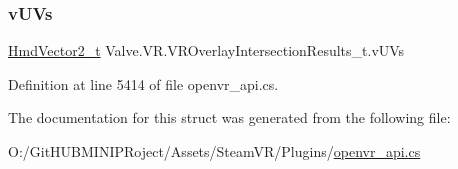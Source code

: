 \subsubsection{\texorpdfstring{vUVs}{vUVs}}
{\footnotesize\ttfamily \mbox{\hyperlink{struct_valve_1_1_v_r_1_1_hmd_vector2__t}{Hmd\+Vector2\+\_\+t}} Valve.\+V\+R.\+V\+R\+Overlay\+Intersection\+Results\+\_\+t.\+v\+U\+Vs}



Definition at line 5414 of file openvr\+\_\+api.\+cs.



The documentation for this struct was generated from the following file\+:\begin{DoxyCompactItemize}
\item 
O\+:/\+Git\+H\+U\+B\+M\+I\+N\+I\+P\+Roject/\+Assets/\+Steam\+V\+R/\+Plugins/\mbox{\hyperlink{openvr__api_8cs}{openvr\+\_\+api.\+cs}}\end{DoxyCompactItemize}

